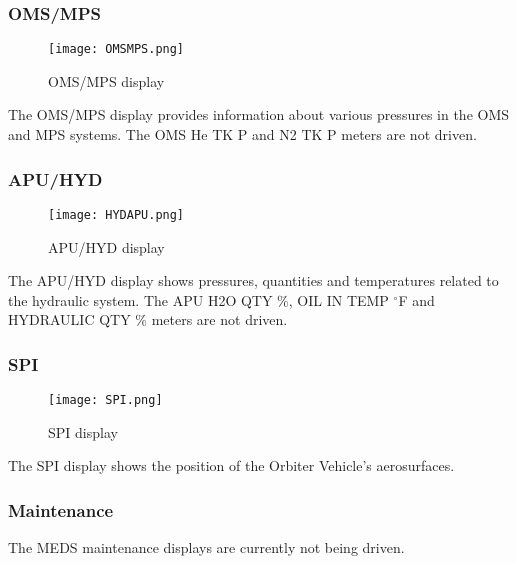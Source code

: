 \documentclass[Space_Shuttle_Vessel_Manual.tex]{subfiles}
\begin{document}
\begin{multicols*}{2}
\subsubsection{OMS/MPS}
\begin{figure}[H]
  \texttt{[image: OMSMPS.png]}
  \caption{OMS/MPS display}
  \label{fig:OMS_MPS_MEDS}
\end{figure}
The OMS/MPS display provides information about various pressures in the OMS and MPS systems. The OMS He TK P and N2 TK P meters are not driven.

\subsubsection{APU/HYD}
\begin{figure}[H]
  \texttt{[image: HYDAPU.png]}
  \caption{APU/HYD display}
  \label{fig:APU_HYD_MEDS}
\end{figure}
The APU/HYD display shows pressures, quantities and temperatures related to the hydraulic system. The APU H2O QTY \%, OIL IN TEMP $^\circ$F and HYDRAULIC QTY \% meters are not driven.

\subsubsection{SPI}
\begin{figure}[H]
  \texttt{[image: SPI.png]}
  \caption{SPI display}
  \label{fig:SPI_MEDS}
\end{figure}
The SPI display shows the position of the Orbiter Vehicle's aerosurfaces.

\subsubsection{Maintenance}
The MEDS maintenance displays are currently not being driven.
\end{multicols*}
\end{document}
